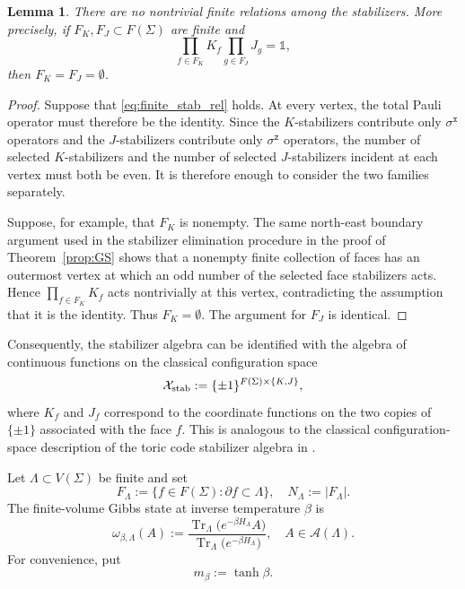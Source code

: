 \documentclass[a4paper,11pt]{article}
\newtheorem{lemma}[theorem]{Lemma}
\theoremstyle{definition}
\theoremstyle{remark}
\theoremstyle{remark}
\begin{document}
\begin{lemma}\label{lem:finite_stab_indep}
    There are no nontrivial finite relations among the stabilizers. More precisely, if $F_K,F_J\subset F(\Sigma)$ are finite and
    \begin{equation} \label{eq:finite_stab_rel}
        \prod_{f\in F_K}K_f\prod_{g\in F_J}J_g=\mathds{1},
    \end{equation}
    then $F_K=F_J=\emptyset$. 
\end{lemma}

\begin{proof}
    Suppose that \eqref{eq:finite_stab_rel} holds. At every vertex, the total Pauli operator must therefore be the identity. Since the $K$-stabilizers contribute only $\sigma^{\mathtt{x}}$ operators and the $J$-stabilizers contribute only $\sigma^{\mathtt{z}}$ operators, the number of selected $K$-stabilizers and the number of selected $J$-stabilizers incident at each vertex must both be even. It is therefore enough to consider the two families separately.
    
    Suppose, for example, that $F_K$ is nonempty. The same north-east boundary argument used in the stabilizer elimination procedure in the proof of Theorem~\ref{prop:GS} shows that a nonempty finite collection of faces has an outermost vertex at which an odd number of the selected face stabilizers acts. Hence $\prod_{f\in F_K}K_f$ acts nontrivially at this vertex, contradicting the assumption that it is the identity. Thus $F_K=\emptyset$. The argument for $F_J$ is identical.
\end{proof}



Consequently, the stabilizer algebra can be identified with the algebra of continuous functions on the classical configuration space
\begin{equation}\label{eq:stabilizer_configuration_space}
    \mathcal{X}_{\rm stab} := \{\pm1\}^{F(\Sigma)\times\{K,J\}},
\end{equation}
where $K_f$ and $J_f$ correspond to the coordinate functions on the two copies of $\{\pm1\}$ associated with the face $f$. This is analogous to the classical configuration-space description of the toric code stabilizer algebra in \cite[Section~2.2.2]{alicki2007statistical}. 



Let $\Lambda\subset V(\Sigma)$ be finite and set
\[
    F_\Lambda := \{f\in F(\Sigma):\partial f\subset\Lambda\}, \quad N_\Lambda:=|F_\Lambda|.
\]
The finite-volume Gibbs state at inverse temperature $\beta$ is
\begin{equation}\label{eq:finite_Gibbs}
    \omega_{\beta,\Lambda}(A) := \frac{\operatorname{Tr}_{\Lambda}\bigl(e^{-\beta H_\Lambda}A\bigr)}{\operatorname{Tr}_{\Lambda}\bigl(e^{-\beta H_\Lambda}\bigr)},
    \quad A\in\mathcal A(\Lambda).
\end{equation}
For convenience, put
\begin{equation}\label{eq:m_beta}
    m_\beta:=\tanh\beta.
\end{equation}
\end{document}
